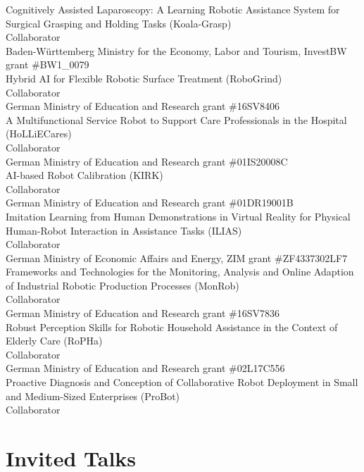 \documentclass[11pt]{article} %
\begin{document}
Cognitively Assisted Laparoscopy: A Learning Robotic Assistance System for Surgical Grasping and Holding Tasks (Koala-Grasp)\\
Collaborator\\
Baden-Württemberg Ministry for the Economy, Labor and Tourism, InvestBW grant \#BW1\_0079\\
Hybrid AI for Flexible Robotic Surface Treatment (RoboGrind)\\
Collaborator\\
German Ministry of Education and Research grant \#16SV8406\\
A Multifunctional Service Robot to Support Care Professionals in the Hospital (HoLLiECares)\\
Collaborator\\
German Ministry of Education and Research grant \#01IS20008C\\
AI-based Robot Calibration (KIRK)\\
Collaborator\\
German Ministry of Education and Research grant \#01DR19001B\\
Imitation Learning from Human Demonstrations in Virtual Reality for Physical Human-Robot Interaction in Assistance Tasks (ILIAS)\\
Collaborator\\
German Ministry of Economic Affairs and Energy, ZIM grant \#ZF4337302LF7\\
Frameworks and Technologies for the Monitoring, Analysis and Online Adaption of Industrial Robotic Production Processes (MonRob)\\
Collaborator\\
German Ministry of Education and Research grant \#16SV7836\\
Robust Perception Skills for Robotic Household Assistance in the Context of Elderly Care (RoPHa)\\
Collaborator\\
German Ministry of Education and Research grant \#02L17C556\\
Proactive Diagnosis and Conception of Collaborative Robot Deployment in Small and Medium-Sized Enterprises (ProBot)\\
Collaborator\\

\section*{Invited Talks}
\end{document}
